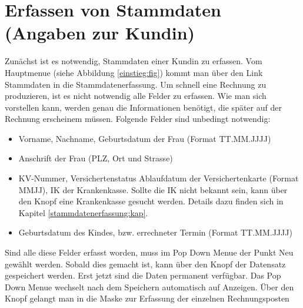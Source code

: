 \section{Erfassen von Stammdaten (Angaben zur Kundin)}\label{kurz:stammdaten:kap}
Zunächst ist es notwendig, Stammdaten einer Kundin zu erfassen. Vom
Hauptmenue (siehe Abbildung \vref{einstieg:fig}) kommt man über den
Link Stammdaten in die Stammdatenerfassung. Um schnell eine Rechnung
zu produzieren, ist es nicht notwendig alle Felder zu erfassen. Wie man
sich vorstellen kann, werden genau die Informationen benötigt, die später
auf der Rechnung erscheinem müssen. Folgende Felder sind unbedingt 
notwendig:
\begin {itemize}
\item Vorname, Nachname, Geburtsdatum der Frau (Format TT.MM.JJJJ)
\item Anschrift der Frau (PLZ, Ort und Strasse)
\item KV-Nummer, Versichertenstatus Ablaufdatum der Versichertenkarte (Format MMJJ),
IK der Krankenkasse. Sollte die IK nicht bekannt sein, kann über den
Knopf  eine Krankenkasse gesucht werden. Details dazu
finden sich in Kapitel \ref{stammdatenerfassung:kap}.
\item Geburtsdatum des Kindes, bzw. errechneter Termin (Format TT.MM.JJJJ)
\end {itemize}
Sind alle diese Felder erfasst worden, muss im Pop Down Menue der Punkt
Neu gewählt werden. Sobald dies gemacht ist, kann über den Knopf
 der Datensatz gespeichert werden. Erst jetzt sind
die Daten permanent verfügbar. Das Pop Down Menue wechselt nach dem Speichern
automatisch auf Anzeigen.
Über den Knopf  gelangt
man in die Maske zur Erfassung der einzelnen Rechnungsposten
%
%
